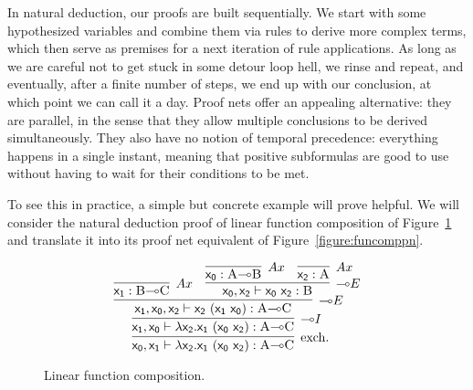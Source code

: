 In natural deduction, our proofs are built sequentially.
We start with some hypothesized variables and combine them via rules to derive more complex terms, which then serve as premises for a next iteration of rule applications.
As long as we are careful not to get stuck in some detour loop hell, we rinse and repeat, and eventually, after a finite number of steps, we end up with our conclusion, at which point we can call it a day.
Proof nets offer an appealing alternative: they are parallel, in the sense that they allow multiple conclusions to be derived simultaneously.
They also have no notion of temporal precedence: everything happens in a single instant, meaning that positive subformulas are good to use without having to wait for their conditions to be met.

To see this in practice, a simple but concrete example will prove helpful.
We will consider the natural deduction proof of linear function composition of Figure~\ref{figure:funcomp} and translate it into its proof net equivalent of Figure~\ref{figure:funcomppn}.

\begin{figure}
	\[
		\infer[\Exchange]{\term{x_0}, \term{x_1} \vdash \term{\lambda x_2.x_1~(x_0~x_2)}: \prop{A} \li \prop{C}}{
			\infer[\li I]{\term{x_1}, \term{x_0} \vdash \term{\lambda x_2.x_1~(x_0~x_2)}: \prop{A} \li \prop{C}}{
				\infer[\li E]{\term{x_1}, \term{x_0}, \term{x_2} \vdash \term{x_2~(x_1~x_0)}: \prop{A} \li \prop{C}}{
					\infer[Ax]{\term{x_1}:\prop{B}\li\prop{C}}{}
					&
					\infer[\li E]{\term{x_0}, \term{x_2} \vdash \term{x_0~x_2}: \prop{B}}{
						\infer[Ax]{\term{x_0}: \prop{A}\li\prop{B}}{}
						&
						\infer[Ax]{\term{x_2}: \prop{A}}{}
					}
				}
			}
		}
	\]
	\caption{Linear function composition.}
	\label{figure:funcomp}
\end{figure}

